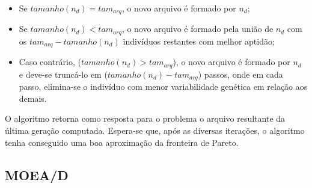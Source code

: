 \begin{itemize}  
	\item Se $tamanho(n_d) = tam_{arq}$, o novo arquivo é formado por $n_d$;
	\item Se $tamanho(n_d) < tam_{arq}$, o novo arquivo é formado pela união de $n_d$ com os $tam_{arq} - tamanho(n_d)$ indivíduos restantes com melhor aptidão;
	\item Caso contrário, ($tamanho(n_d) > tam_{arq}$), o novo arquivo é formado por $n_d$ e deve-se truncá-lo em ($tamanho(n_d) - tam_{arq}$) passos, onde em cada passo, elimina-se o indivíduo com menor variabilidade genética em relação aos demais.
\end{itemize}

O algoritmo retorna como resposta para o problema o arquivo resultante da última geração computada. Espera-se que, após as diversas iterações, o algoritmo tenha conseguido uma boa aproximação da fronteira de Pareto.



\subsection{MOEA/D}
\label{section_moead}

